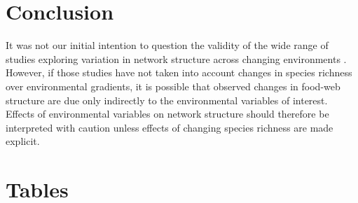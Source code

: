 \documentclass[12pt]{article}
\begin{document}


\section*{Conclusion}

It was not our initial intention to question the validity of the wide range of
studies exploring variation in network structure across changing environments \citep{}.
However, if those studies have not taken into account changes in species
richness over environmental gradients, it is possible that observed changes in
food-web structure are due only indirectly to the environmental variables of
interest. Effects of environmental variables on network structure should
therefore be interpreted with caution unless effects of changing species
richness are made explicit.


\newpage

\newpage

\section*{Tables}
\end{document}
